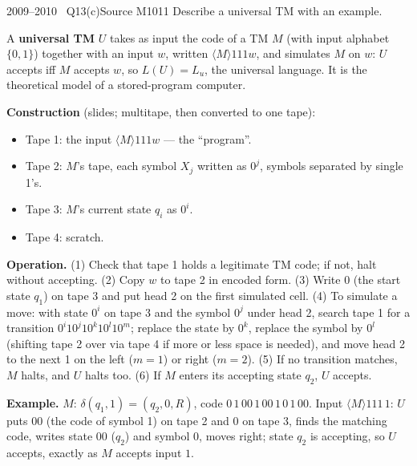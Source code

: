 \documentclass[11pt,a4paper]{article}
\begin{document}
\begin{question}{2009--2010 \textbullet\ Q13(c)}{Source M10}{11}
Describe a universal TM with an example.
\end{question}
\begin{solution}
A \textbf{universal TM} $U$ takes as input the code of a TM $M$ (with input alphabet $\{0,1\}$) together with an input $w$, written $\langle M\rangle111w$, and simulates $M$ on $w$: $U$ accepts iff $M$ accepts $w$, so $L(U)=L_u$, the universal language. It is the theoretical model of a stored-program computer.

\textbf{Construction} (slides; multitape, then converted to one tape):
\begin{itemize}
\item Tape 1: the input $\langle M\rangle111w$ --- the ``program''.
\item Tape 2: $M$'s tape, each symbol $X_j$ written as $0^j$, symbols separated by single 1's.
\item Tape 3: $M$'s current state $q_i$ as $0^i$.
\item Tape 4: scratch.
\end{itemize}
\textbf{Operation.} (1) Check that tape 1 holds a legitimate TM code; if not, halt without accepting. (2) Copy $w$ to tape 2 in encoded form. (3) Write $0$ (the start state $q_1$) on tape 3 and put head 2 on the first simulated cell. (4) To simulate a move: with state $0^i$ on tape 3 and the symbol $0^j$ under head 2, search tape 1 for a transition $0^i10^j10^k10^l10^m$; replace the state by $0^k$, replace the symbol by $0^l$ (shifting tape 2 over via tape 4 if more or less space is needed), and move head 2 to the next 1 on the left ($m=1$) or right ($m=2$). (5) If no transition matches, $M$ halts, and $U$ halts too. (6) If $M$ enters its accepting state $q_2$, $U$ accepts.

\textbf{Example.} $M$: $\delta(q_1,1)=(q_2,0,R)$, code $0\,1\,00\,1\,00\,1\,0\,1\,00$. Input $\langle M\rangle111\,1$: $U$ puts $00$ (the code of symbol 1) on tape 2 and $0$ on tape 3, finds the matching code, writes state $00$ ($q_2$) and symbol $0$, moves right; state $q_2$ is accepting, so $U$ accepts, exactly as $M$ accepts input $1$.
\end{solution}
\end{document}
